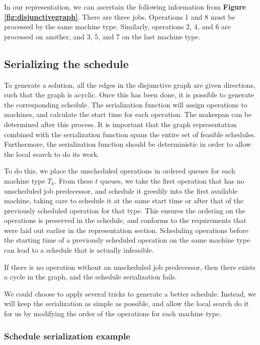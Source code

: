 \documentclass[a4paper,10pt]{article}
\begin{document}
In our representation, we can ascertain the following information from \textbf{Figure \ref{fig:disjunctivegraph}}. There are three jobs. Operations 1 and 8 must be processed by the same machine type. Similarly, operations 2, 4, and 6 are processed on another, and 3, 5, and 7 on the last machine type.

\subsection{Serializing the schedule}

To generate a solution, all the edges in the disjunctive graph are given directions, such that the graph is acyclic. Once this has been done, it is possible to generate the corresponding schedule. The serialization function will assign operations to machines, and calculate the start time for each operation. The makespan can be determined after this process. It is important that the graph representation combined with the serialization function spans the entire set of feasible schedules. Furthermore, the serialization function should be deterministic in order to allow the local search to do its work.

To do this, we place the unscheduled operations in ordered queues for each machine type $T_k$. From these $t$ queues, we take the first operation that has no unscheduled job predecessor, and schedule it greedily into the first available machine, taking care to schedule it at the same start time or after that of the previously scheduled operation for that type. This ensures the ordering on the operations is preserved in the schedule, and conforms to the requirements that were laid out earlier in the representation section. Scheduling operations before the starting time of a previously scheduled operation on the same machine type can lead to a schedule that is actually infeasible.

If there is no operation without an unscheduled job predecessor, then there exists a cycle in the graph, and the schedule serialization fails.

We could choose to apply several tricks to generate a better schedule. Instead, we will keep the serialization as simple as possible, and allow the local search do it for us by modifying the order of the operations for each machine type.

\subsubsection{Schedule serialization example}
\end{document}
